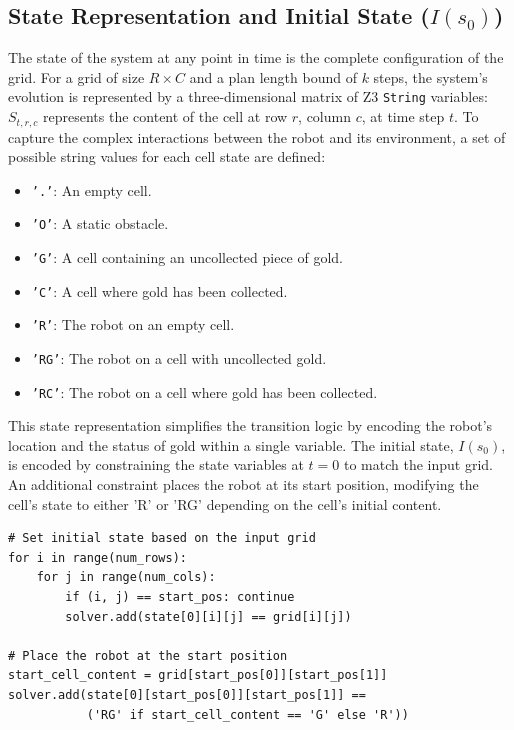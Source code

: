\documentclass[12pt, a4paper, oneside]{report} %
\begin{document}
\subsection[State Representation and Initial State (I(s0))]{State Representation and Initial State ($I(s_0)$)}
The state of the system at any point in time is the complete configuration of the grid. For a grid of size $R \times C$ and a plan length bound of $k$ steps, the system's evolution is represented by a three-dimensional matrix of Z3 \texttt{String} variables: $S_{t,r,c}$ represents the content of the cell at row $r$, column $c$, at time step $t$.
To capture the complex interactions between the robot and its environment, a set of possible string values for each cell state are defined:
\begin{itemize}
    \item \texttt{'.'}: An empty cell.
    \item \texttt{'O'}: A static obstacle.
    \item \texttt{'G'}: A cell containing an uncollected piece of gold.
    \item \texttt{'C'}: A cell where gold has been collected.
    \item \texttt{'R'}: The robot on an empty cell.
    \item \texttt{'RG'}: The robot on a cell with uncollected gold.
    \item \texttt{'RC'}: The robot on a cell where gold has been collected.
\end{itemize}
This state representation simplifies the transition logic by encoding the robot's location and the status of gold within a single variable.
The initial state, $I(s_0)$, is encoded by constraining the state variables at $t=0$ to match the input grid. An additional constraint places the robot at its start position, modifying the cell's state to either 'R' or 'RG' depending on the cell's initial content.
\begin{verbatim}
# Set initial state based on the input grid
for i in range(num_rows):
    for j in range(num_cols):
        if (i, j) == start_pos: continue
        solver.add(state[0][i][j] == grid[i][j])

# Place the robot at the start position
start_cell_content = grid[start_pos[0]][start_pos[1]]
solver.add(state[0][start_pos[0]][start_pos[1]] == 
           ('RG' if start_cell_content == 'G' else 'R'))
\end{verbatim}
\end{document}
